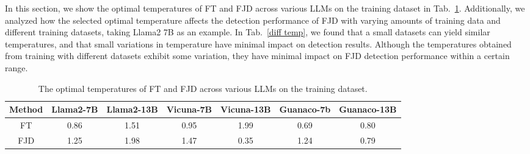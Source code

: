 \documentclass{article}
\begin{document}
In this section, we show the optimal temperatures of FT and FJD across various LLMs on the training dataset in Tab.~\ref{temp best}. Additionally, we analyzed how the selected optimal temperature affects the detection performance of FJD with varying amounts of training data and different training datasets, taking Llama2 7B as an example. In Tab.~\ref{diff temp}, we found that a small datasets can yield similar temperatures, and that small variations in temperature have minimal impact on detection results. Although the temperatures obtained from training with different datasets exhibit some variation, they have minimal impact on FJD detection performance within a certain range.

\begin{table}[t]
    \centering
    \footnotesize
    \setlength\tabcolsep{10pt}
    \caption{The optimal temperatures of FT and FJD across various LLMs on the training dataset.}
    \begin{tabular}{ccccccc}
    
    \toprule
        \textbf{Method}  & \textbf{Llama2-7B} & \textbf{Llama2-13B} & \textbf{Vicuna-7B} & \textbf{Vicuna-13B} & \textbf{Guanaco-7b} & \textbf{Guanaco-13B} \\
        \midrule
        FT & 0.86 & 1.51 & 0.95 & 1.99 & 0.69 & 0.80 \\
        FJD & 1.25 & 1.98 & 1.47 & 0.35 & 1.24 & 0.79  \\
    \bottomrule
    \end{tabular}
    
    \label{temp best}
\end{table}
\end{document}
